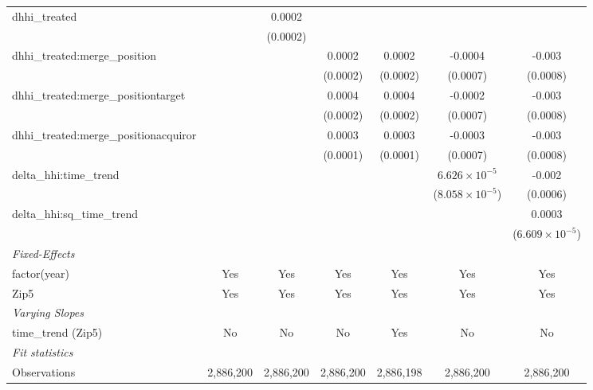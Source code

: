 \begin{table}[H]
{\begin{tabular}{lcccccc}
 dhhi_treated&  &0.0002&  &  &  &  \\ 

   &  &(0.0002)&  &  &  &  \\ 

 dhhi_treated:merge_position&  &  &0.0002&0.0002&-0.0004&-0.003\sym{***}\\ 

   &  &  &(0.0002)&(0.0002)&(0.0007)&(0.0008)\\ 

 dhhi_treated:merge_positiontarget&  &  &0.0004\sym{***}&0.0004\sym{***}&-0.0002&-0.003\sym{***}\\ 

   &  &  &(0.0002)&(0.0002)&(0.0007)&(0.0008)\\ 

 dhhi_treated:merge_positionacquiror&  &  &0.0003\sym{**}&0.0003\sym{**}&-0.0003&-0.003\sym{***}\\ 

   &  &  &(0.0001)&(0.0001)&(0.0007)&(0.0008)\\ 

 delta_hhi:time_trend&  &  &  &  &$6.626\times 10^{-5}$&-0.002\sym{***}\\ 

   &  &  &  &  &($8.058\times 10^{-5}$)&(0.0006)\\ 

 delta_hhi:sq_time_trend&  &  &  &  &  &0.0003\sym{***}\\ 

   &  &  &  &  &  &($6.609\times 10^{-5}$)\\ 

 \hline 

 \emph{Fixed-Effects}&  & & & & & \\ 

 factor(year)&Yes&Yes&Yes&Yes&Yes&Yes\\ 

 Zip5&Yes&Yes&Yes&Yes&Yes&Yes\\ 

 \hline 

 \emph{Varying Slopes}&  & & & & & \\ 

 time_trend (Zip5)&No&No&No&Yes&No&No\\ 

 \hline 

 \emph{Fit statistics}&  & & & & & \\ 

 Observations& 2,886,200&2,886,200&2,886,200&2,886,198&2,886,200&2,886,200\\ 


\end{tabular}}
\end{table}
